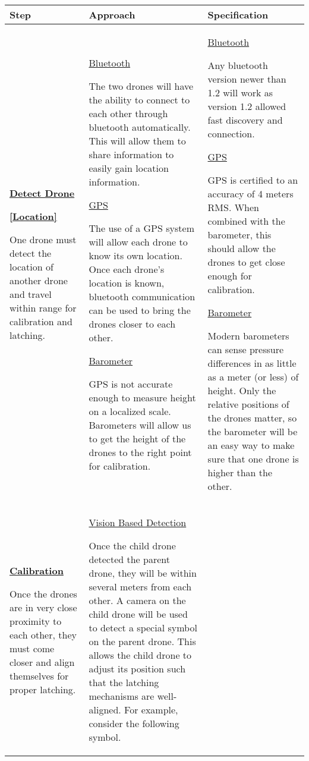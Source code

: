 \documentclass[paper=a4, fontsize=12pt]{scrartcl}
\begin{document}
\begin{longtable} { |p{}|p{}|p{}| }	
	\hline
	\textbf{Step} & \textbf{Approach} & \textbf{Specification} \\
	\hline
	\underline{\textbf{Detect Drone}}\par\underline{\textbf{[Location]}}\par
	One drone must detect the location of another drone and travel within range for calibration and latching. 
	&
	\underline{Bluetooth}\par
	The two drones will have the ability to connect to each other through bluetooth automatically. This will allow them to share information to easily gain location information.\par\hfill\par 
	\underline{GPS}\par 
	The use of a GPS system will allow each drone to know its own location. Once each drone's location is known, bluetooth communication can be used to bring the drones closer to each other.\par\hfill\par 
	\underline{Barometer}\par 
	GPS is not accurate enough to measure height on a localized scale. Barometers will allow us to get the height of the drones to the right point for calibration.
	&
	\underline{Bluetooth}\par 
	Any bluetooth version newer than 1.2 will work as version 1.2 allowed fast discovery and connection.\par\hfill\par 
	\underline{GPS}\par 
	GPS is certified to an accuracy of 4 meters RMS. When combined with the barometer, this should allow the drones to get close enough for calibration.\par\hfill\par 
	\underline{Barometer}\par 
	Modern barometers can sense pressure differences in as little as a meter (or less) of height.
	Only the relative positions of the drones matter, so the barometer will be an easy way to make sure that one drone is higher than the other.\\
	\hline
	\underline{\textbf{Calibration}}\par
	Once the drones are in very close proximity to each other, they must come closer and align themselves for proper latching.			
	& 
	\underline{Vision Based Detection}\par
	Once the child drone detected the parent drone, they will be within several meters from each other. A camera on the child drone will be used to detect a special symbol on the parent drone.
	This allows the child drone to adjust its position such that the latching mechanisms are well-aligned. For example, consider the following symbol.
			

\end{longtable}
\end{document}
